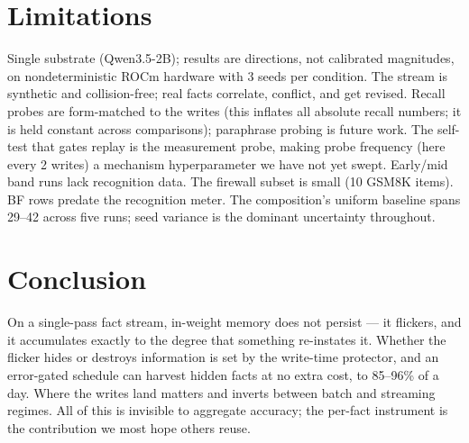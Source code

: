 \documentclass[11pt]{article}
\newcommand{\qwen}{Qwen3.5-2B}
\begin{document}
\section{Limitations}\label{sec:limits}

Single substrate (\qwen{}); results are directions, not calibrated magnitudes, on nondeterministic
ROCm hardware with 3 seeds per condition. The stream is synthetic and collision-free; real facts
correlate, conflict, and get revised. Recall probes are form-matched to the writes (this inflates all
absolute recall numbers; it is held constant across comparisons); paraphrase probing is future work.
The self-test that gates replay is the measurement probe, making probe frequency (here every 2 writes)
a mechanism hyperparameter we have not yet swept. Early/mid band runs lack recognition data. The
firewall subset is small (10 GSM8K items). BF rows predate the recognition meter. The composition's
uniform baseline spans 29--42 across five runs; seed variance is the dominant uncertainty throughout.

\section{Conclusion}

On a single-pass fact stream, in-weight memory does not persist --- it flickers, and it accumulates
exactly to the degree that something re-instates it. Whether the flicker hides or destroys information
is set by the write-time protector, and an error-gated schedule can harvest hidden facts at no extra
cost, to 85--96\% of a day. Where the writes land matters and inverts between batch and streaming
regimes. All of this is invisible to aggregate accuracy; the per-fact instrument is the contribution we
most hope others reuse.
\end{document}

